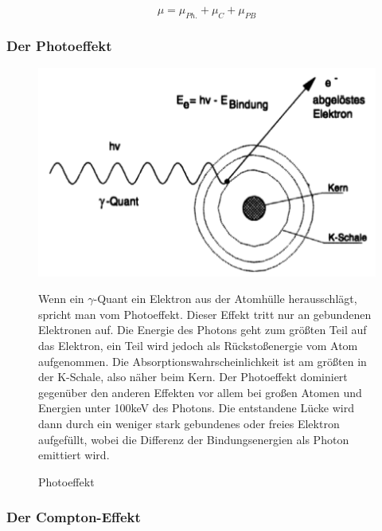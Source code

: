 $$\mu = \mu_{Ph.} + \mu_{C} + \mu_{PB} $$

\subsubsection{Der Photoeffekt}

\begin{figure}[H]
	\begin{minipage}{0.59\textwidth}
	\centering \includegraphics[width=\textwidth]{Bilder/Photoeffekt.png}
	\caption{Photoeffekt}
	\end{minipage}
	\begin{minipage}{0.4\textwidth}
	Wenn ein $\gamma$-Quant ein Elektron aus der Atomhülle herausschlägt, spricht man vom Photoeffekt. Dieser Effekt tritt nur an gebundenen Elek\-tro\-nen auf. Die Energie des Photons geht zum größten Teil auf das Elektron, ein Teil wird jedoch als Rückstoßenergie vom Atom aufgenommen. Die Ab\-sorp\-tions\-wahrscheinlichkeit ist am größten in der K-Schale, also näher beim Kern. Der Photoeffekt dominiert gegenüber den anderen Effekten vor allem bei großen Atomen und Energien unter 100keV des Photons. Die entstandene Lücke wird dann durch ein weniger stark gebundenes oder freies Elektron aufgefüllt, wobei die Differenz der Bindungsenergien als Photon emittiert wird.
	\end{minipage}
\end{figure}

\subsubsection{Der Compton-Effekt}

